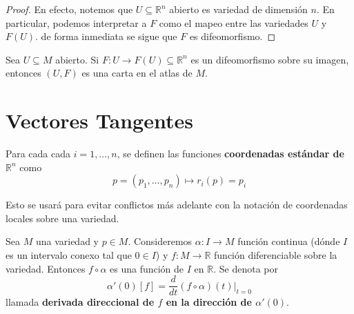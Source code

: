 \documentclass[12pt]{report}
\theoremstyle{largebreak}
\begin{document}
    \begin{proof}
        En efecto, notemos que $U\subseteq\mathbb{R}^n$ abierto es variedad de dimensión $n$. En particular, podemos interpretar a $F$ como el mapeo entre las variedades $U$ y $F(U)$. de forma inmediata se sigue que $F$ es difeomorfismo.
    \end{proof}

    \begin{propo}
        Sea $U\subseteq M$ abierto. Si $F:U\rightarrow F(U)\subseteq\mathbb{R}^n$ es un difeomorfismo sobre su imagen, entonces $(U,F)$ es una carta en el atlas de $M$.
    \end{propo}

    \section{Vectores Tangentes}


    \begin{mydef}
        Para cada cada $i=1,\dots,n$, se definen las funciones \textbf{coordenadas estándar de $\mathbb{R}^n$} como
        \begin{equation*}
            p=(p_1,\dots, p_n)\mapsto r_i(p)=p_i
        \end{equation*}
    \end{mydef}

    Esto se usará para evitar conflictos más adelante con la notación de coordenadas locales sobre una variedad.

    \begin{mydef}
        Sea $M$ una variedad y $p\in M$. Consideremos $\alpha:I\rightarrow M$ función continua (dónde $I$ es un intervalo conexo tal que $0\in I$) y $f:M\rightarrow \mathbb{R}$ función diferenciable sobre la variedad. Entonces $f\circ \alpha$ es una función de $I$ en $\mathbb{R}$. Se denota por
        \begin{equation*}
            \alpha'(0)[f]=\frac{d}{dt}(f\circ\alpha)(t)\Big|_{t=0}
        \end{equation*}
        llamada \textbf{derivada direccional de $f$ en la dirección de $\alpha'(0)$}.
    \end{mydef}

    \begin{propo}
        
    \end{propo}
\end{document}
